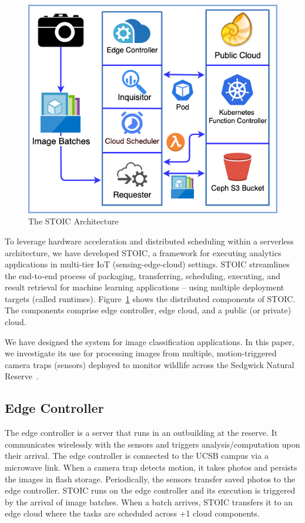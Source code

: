 \begin{figure}
    \centering
    \includegraphics[scale=0.4]{figures/STOIC.png}
    \caption{The STOIC Architecture \label{fig:STOIC}}
\end{figure}

To leverage hardware acceleration and distributed scheduling within a serverless architecture, we have developed STOIC, a framework for executing analytics applications in multi-tier IoT (sensing-edge-cloud) settings. STOIC streamlines the end-to-end process of packaging, transferring, scheduling, executing, and result retrieval for machine learning applications -- using multiple deployment targets (called runtimes). Figure~\ref{fig:STOIC} shows the distributed components of STOIC. The components comprise edge controller, edge cloud, and a public (or private) cloud.

We have designed the system for image classification applications. In this paper, we investigate its use for processing images from multiple, motion-triggered camera traps (sensors) deployed to monitor wildlife across the Sedgwick Natural Reserve~\cite{ref:sedgwick}.

\subsection{Edge Controller}
The edge controller is a server that runs in an outbuilding at the reserve. It communicates wirelessly with the sensors and triggers analysis/computation upon their arrival. The edge controller is connected to the UCSB campus via a microwave link. When a camera trap detects motion, it takes photos and persists the images in flash storage. Periodically, the sensors transfer saved photos to the edge controller. STOIC runs on the edge controller and its execution is triggered by the arrival of image batches. When a batch arrives, STOIC transfers it to an edge cloud where the tasks are scheduled across +1 cloud components.
 

